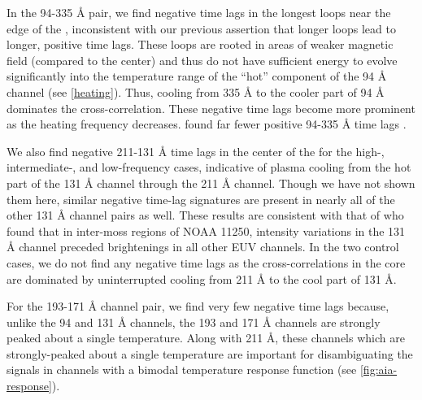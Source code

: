In the 94-335 \AA{} pair, we find negative time lags in the longest loops near the edge of the \AR{}, inconsistent with our previous assertion that longer loops lead to longer, positive time lags. These loops are rooted in areas of weaker magnetic field (compared to the center) and thus do not have sufficient energy to evolve significantly into the temperature range of the ``hot'' component of the 94 \AA{} channel (see \autoref{heating}). Thus, cooling from 335 \AA{} to the cooler part of 94 \AA{} dominates the cross-correlation. These negative time lags become more prominent as the heating frequency decreases.   \citeauthor{viall_survey_2017} found far fewer positive  94-335 \AA{} time lags .

We also find negative 211-131 \AA{} time lags in the center of the \AR{} for the high-, intermediate-, and low-frequency cases, indicative of plasma cooling from the hot part of the 131 \AA{} channel through the 211 \AA{} channel. Though we have not shown them here, similar negative time-lag signatures are present in nearly all of the other 131 \AA{} channel pairs as well. These results are consistent with that of \citet{cadavid_heating_2014} who found that in inter-moss regions of \AR{} NOAA 11250, intensity variations in the 131 \AA{} channel preceded brightenings in all other EUV channels. In the two control cases, we do not find any negative time lags as the cross-correlations in the core are dominated by uninterrupted cooling from 211 \AA{} to the cool part of 131 \AA{}.

For the 193-171 \AA{} channel pair, we find very few negative time lags because, unlike the 94 and 131 \AA{} channels, the 193 and 171 \AA{} channels are strongly peaked about a single temperature. Along with 211 \AA{}, these channels which are strongly-peaked about a single temperature are important for disambiguating the signals in channels with a bimodal temperature response function (see \autoref{fig:aia-response}).


